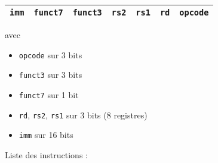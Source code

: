 \documentclass[a4paper]{article}
\begin{document}
    \begin{tabular}{|c|c|c|c|c|c|c|}
        \hline
        \texttt{imm} & \texttt{funct7} & \texttt{funct3} & \texttt{rs2} & \texttt{rs1} & \texttt{rd} & \texttt{opcode} \\
        \hline
    \end{tabular}

    avec \begin{itemize}
        \item \texttt{opcode} sur 3 bits
        \item \texttt{funct3} sur 3 bits
        \item \texttt{funct7} sur 1 bit 
        \item \texttt{rd}, \texttt{rs2}, \texttt{rs1} sur 3 bits (8 registres)
        \item \texttt{imm} sur 16 bits
    \end{itemize}

    Liste des instructions :
\end{document}
